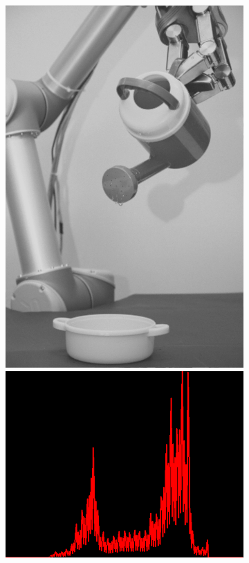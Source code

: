 \begin{figure}[H]
    \begin{subfigure}[b]{0.28\textwidth}
        \includegraphics[width=\textwidth]{img3/contrast_5_0_85_final_img3.png}\\[0.1cm]
        \includegraphics[width=\textwidth]{img3/hist_0_85_contrast_5_0_85_final_img3.png}

\end{subfigure}
\end{figure}
